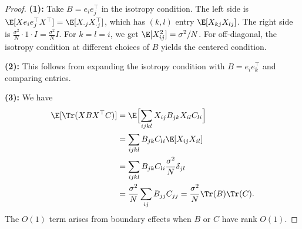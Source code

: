 \begin{proof}
\textbf{(1):} Take $B = e_i e_j^\top$ in the isotropy condition. The left side is $\E[X e_i e_j^\top X^\top] = \E[X_{\cdot j} X_{\cdot j}^\top]$, which has $(k, l)$ entry $\E[X_{kj} X_{lj}]$. The right side is $\frac{\sigma^2}{N} \cdot 1 \cdot I = \frac{\sigma^2}{N} I$. For $k = l = i$, we get $\E[X_{ij}^2] = \sigma^2/N$. For off-diagonal, the isotropy condition at different choices of $B$ yields the centered condition.

\medskip
\noindent\textbf{(2):} This follows from expanding the isotropy condition with $B = e_i e_k^\top$ and comparing entries.

\medskip
\noindent\textbf{(3):} We have
\begin{align}
\E[\Tr(XBX^\top C)]
&= \E\Bigl[\sum_{ijkl} X_{ij} B_{jk} X_{il} C_{li}\Bigr] \\
&= \sum_{ijkl} B_{jk} C_{li} \E[X_{ij} X_{il}] \\
&= \sum_{ijkl} B_{jk} C_{li} \frac{\sigma^2}{N} \delta_{jl} \\
&= \frac{\sigma^2}{N} \sum_{ij} B_{jj} C_{jj} = \frac{\sigma^2}{N} \Tr(B) \Tr(C).
\end{align}
The $O(1)$ term arises from boundary effects when $B$ or $C$ have rank $O(1)$.
\end{proof}
